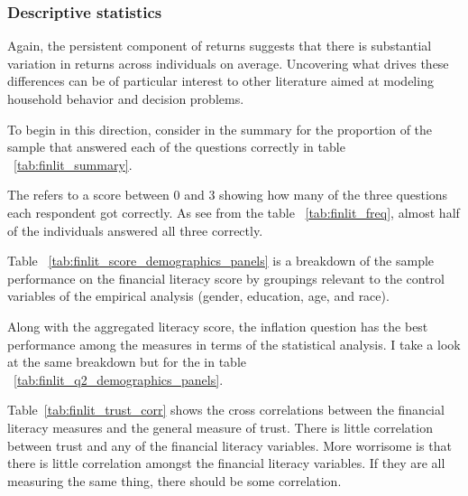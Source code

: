 \subsubsection{Descriptive statistics}

\par Again, the persistent component of returns suggests that there is substantial variation in returns across individuals on average. Uncovering what drives these differences can be of particular interest to other literature aimed at modeling household behavior and decision problems.

\par To begin in this direction, consider in the summary for the proportion of the sample that answered each of the questions correctly in table ~\ref{tab:finlit_summary}.

\label{tab:finlit_summary}
\FloatBarrier

\par The  refers to a score between 0 and 3 showing how many of the three questions each respondent got correctly. As see from the table ~\ref{tab:finlit_freq}, almost half of the individuals answered all three correctly.

\label{tab:finlit_freq}
\FloatBarrier

\par Table ~\ref{tab:finlit_score_demographics_panels} is a breakdown of the sample performance on the financial literacy score by groupings relevant to the control variables of the empirical analysis (gender, education, age, and race).

\label{tab:finlit_score_demographics_panels}
\FloatBarrier

\par Along with the aggregated literacy score, the inflation question has the best performance among the measures in terms of the statistical analysis. I take a look at the same breakdown but for the  in table ~\ref{tab:finlit_q2_demographics_panels}. 

\label{tab:finlit_q2_demographics_panels}
\FloatBarrier
 
\par Table~\ref{tab:finlit_trust_corr} shows the cross correlations between the financial literacy measures and the general measure of trust. There is little correlation between trust and any of the financial literacy variables. More worrisome is that there is little correlation amongst the financial literacy variables. If they are all measuring the same thing, there should be some correlation. 

